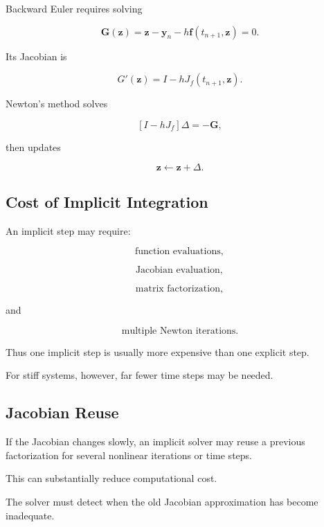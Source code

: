 Backward Euler requires solving

\[
\boxed{
\mathbf{G}(\mathbf{z})
=
\mathbf{z}
-
\mathbf{y}_n
-
h
\mathbf{f}
(
t_{n+1},\mathbf{z}
)
=
0.
}
\]

Its Jacobian is

\[
\boxed{
G'(\mathbf{z})
=
I
-
h
J_f
(
t_{n+1},\mathbf{z}
).
}
\]

Newton's method solves

\[
\boxed{
\left[
I-hJ_f
\right]
\Delta
=
-\mathbf{G},
}
\]

then updates

\[
\boxed{
\mathbf{z}
\leftarrow
\mathbf{z}+\Delta.
}
\]

\subsection{Cost of Implicit Integration}
\label{subsec:implicit-integration-cost}

An implicit step may require:

\[
\boxed{
\text{function evaluations},
}
\]

\[
\boxed{
\text{Jacobian evaluation},
}
\]

\[
\boxed{
\text{matrix factorization},
}
\]

and

\[
\boxed{
\text{multiple Newton iterations}.
}
\]

Thus one implicit step is usually more expensive than one explicit step.

For stiff systems, however, far fewer time steps may be needed.

\subsection{Jacobian Reuse}
\label{subsec:ode-jacobian-reuse}

If the Jacobian changes slowly, an implicit solver may reuse a previous
factorization for several nonlinear iterations or time steps.

This can substantially reduce computational cost.

The solver must detect when the old Jacobian approximation has become
inadequate.

